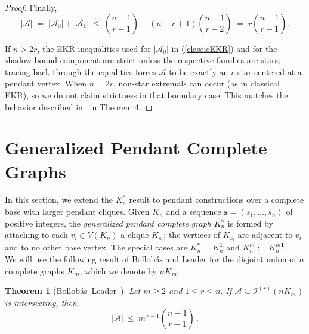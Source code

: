\documentclass{article}
\newtheorem{theorem}{Theorem}
\theoremstyle{definition}
\newcommand{\A}{\mathcal{A}}
\newcommand{\s}{\mathbf{s}}
\newcommand{\1}{\mathbf{1}}
\begin{document}
\begin{proof}
Finally,
\[
|\A|
\;=\;
|\A_0|+|\A_1|
\ \le\ 
\binom{n-1}{r-1} + (n-r+1)\binom{n-1}{r-2}
\;=\;
r\binom{n-1}{r-1}.
\]

If $n>2r$, the EKR inequalities used for $|\A_0|$ in (\ref{classicEKR}) and for the shadow-bound component are strict unless the respective families are stars; tracing back through the equalities forces $\A$ to be exactly an $r$-star centered at a pendant vertex. When $n=2r$, non-star extremals can occur (as in classical EKR), so we do not claim strictness in that boundary case. This matches the behavior described in~\cite{DeSilvaDDH2023} in Theorem 4.
\end{proof}




















\section{Generalized Pendant Complete Graphs}\label{sec4}

In this section, we extend the $K_n^*$ result to pendant constructions over a complete base with larger pendant cliques. 
Given $K_n$ and a sequence $\s=(s_1,\dots,s_n)$ of positive integers, the \emph{generalized pendant complete graph} $K_n^{\s}$ is formed by attaching to each $v_i\in V(K_n)$ a clique $K_{s_i}$; the vertices of $K_{s_i}$ are adjacent to $v_i$ and to no other base vertex. The special cases are $K_n^{*}=K_n^{\mathbf{1}}$ and $K_n^m:=K_n^{m\mathbf{1}}$.\\

\noindent We will use the following result of Bollobás and Leader for the disjoint union of $n$ complete graphs $K_m$, which we denote by $n K_m$.

\begin{theorem}[Bollobás--Leader~\cite{BollLead}]\label{thm:BollobasLeader}
Let $m\ge 2$ and $1\le r\le n$. If $\A\subseteq \mathcal{I}^{(r)}(nK_m)$ is intersecting, then
\[
|\A|\ \le\ m^{\,r-1}\binom{n-1}{r-1}\,.
\]
\end{theorem}
\end{document}
